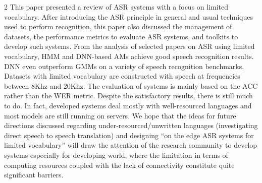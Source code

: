 \begin{multicols}{2}
This paper presented a review of ASR systems with a focus on limited vocabulary. After introducing the ASR principle in general and usual techniques used to perform recognition, this paper also discussed the management of datasets, the performance metrics to evaluate ASR systems, and toolkits to develop such systems. From the analysis of selected papers on ASR using limited vocabulary, HMM and DNN-based AMs achieve good speech recognition results. DNN even outperform GMMs on a variety of speech recognition benchmarks. Datasets with limited vocabulary are constructed with speech at frequencies between 8Khz and 20Khz. The evaluation of systems is mainly based on the ACC rather than the WER metric. Despite the satisfactory results, there is still much to do. In fact, developed systems deal mostly with well-resourced languages and most models are still running on servers. We hope that the ideas for future directions discussed regarding under-resourced/unwritten languages (investigating direct speech to speech translation) and designing “on the edge ASR systems for limited vocabulary” will draw the attention of the research community to develop systems especially for developing world, where the limitation in terms of computing resources coupled with the lack of connectivity constitute quite significant barriers.

\end{multicols}
